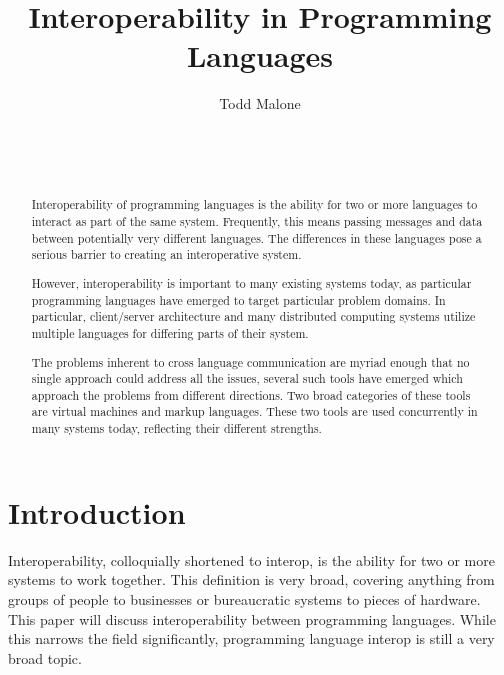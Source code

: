 \documentclass{sig-alternate}
\begin{document}

\title{Interoperability in Programming Languages}


\author{
\alignauthor
Todd Malone\\
	\\
	\\
	\\
}

\maketitle
\begin{abstract}
Interoperability of programming languages is the ability for two or more languages to interact as part of the same system. Frequently, this means passing messages and data between potentially very different languages.
The differences in these languages pose a serious barrier to creating an interoperative system.

However, interoperability is important to many existing systems today, as particular programming languages have emerged to target particular problem domains. In particular, client/server architecture and many distributed computing systems utilize multiple languages for differing parts of their system.


The problems inherent to cross language communication are myriad enough that no single approach could address all the issues, several such tools have emerged which approach the problems from different directions.
Two broad categories of these tools are virtual machines and markup languages. These two tools are used concurrently in many systems today, reflecting their different strengths.
\end{abstract}


\section{Introduction}
Interoperability, colloquially shortened to interop, is the ability for two or more systems to work together. This definition is very broad, covering anything from groups of people to businesses or bureaucratic systems to pieces of hardware. This paper will discuss interoperability between programming languages. While this narrows the field significantly, programming language interop is still a very broad topic.
\end{document}
